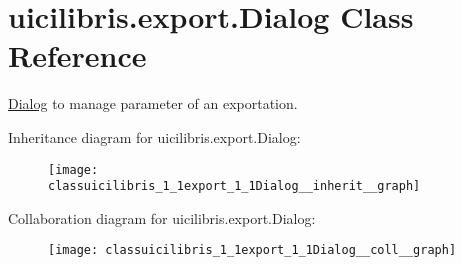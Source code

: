 \hypertarget{classuicilibris_1_1export_1_1Dialog}{\section{uicilibris.\-export.\-Dialog \-Class \-Reference}
\label{classuicilibris_1_1export_1_1Dialog}
}


\hyperlink{classuicilibris_1_1export_1_1Dialog}{\-Dialog} to manage parameter of an exportation.  




\-Inheritance diagram for uicilibris.\-export.\-Dialog\-:
\nopagebreak
\begin{figure}[H]
\begin{center}
\leavevmode
\texttt{[image: classuicilibris\_1\_1export\_1\_1Dialog\_\_inherit\_\_graph]}
\end{center}
\end{figure}


\-Collaboration diagram for uicilibris.\-export.\-Dialog\-:
\nopagebreak
\begin{figure}[H]
\begin{center}
\leavevmode
\texttt{[image: classuicilibris\_1\_1export\_1\_1Dialog\_\_coll\_\_graph]}
\end{center}
\end{figure}
